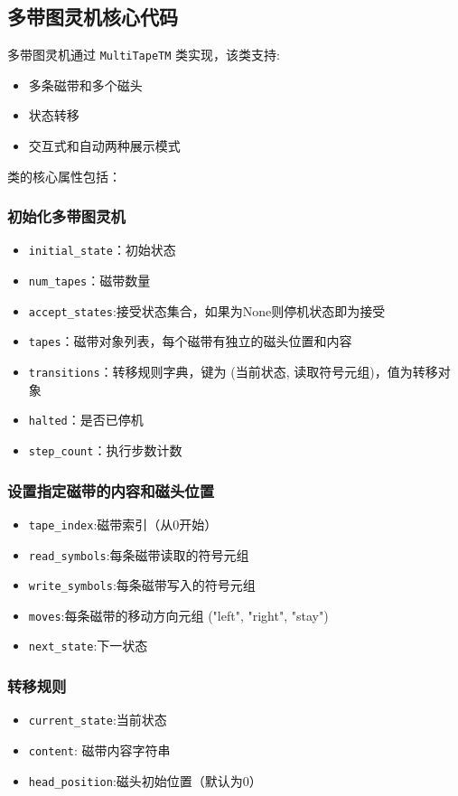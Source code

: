 \documentclass{sysucseexp}
\begin{document}
\subsection{多带图灵机核心代码}


多带图灵机通过 \texttt{MultiTapeTM} 类实现，该类支持:
\begin{itemize}
    \item 多条磁带和多个磁头
    \item 状态转移
    \item 交互式和自动两种展示模式
\end{itemize}

类的核心属性包括：

\subsubsection{初始化多带图灵机}
\begin{itemize}
    \item \texttt{initial\_state}：初始状态
    \item \texttt{num\_tapes}：磁带数量
    \item \texttt{accept\_states}:接受状态集合，如果为None则停机状态即为接受
    \item \texttt{tapes}：磁带对象列表，每个磁带有独立的磁头位置和内容
    \item \texttt{transitions}：转移规则字典，键为 (当前状态, 读取符号元组)，值为转移对象
    \item \texttt{halted}：是否已停机
    \item \texttt{step\_count}：执行步数计数
\end{itemize}

\subsubsection{设置指定磁带的内容和磁头位置}
\begin{itemize}
    \item \texttt{tape\_index}:磁带索引（从0开始）
    \item \texttt{read\_symbols}:每条磁带读取的符号元组
    \item \texttt{write\_symbols}:每条磁带写入的符号元组
    \item \texttt{moves}:每条磁带的移动方向元组 ("left", "right", "stay")
    \item \texttt{next\_state}:下一状态
\end{itemize}

\subsubsection{转移规则}
\begin{itemize}
    \item \texttt{current\_state}:当前状态
    \item \texttt{content}: 磁带内容字符串
    \item \texttt{head\_position}:磁头初始位置（默认为0）
\end{itemize}
\end{document}
